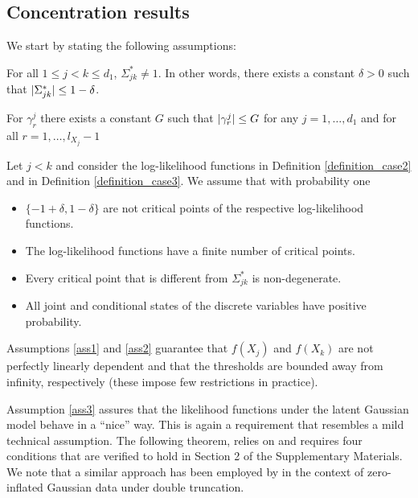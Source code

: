 \subsection{Concentration results}\label{sec::convergence_results}

We start by stating the following assumptions:

\begin{assumption}\label{ass1}
    For all $1 \leq j < k \leq d_1$, $\Sigma_{jk}^* \neq 1$. In other words, there exists a constant $\delta > 0$ such that $\lvert\Sigma_{jk}^*\rvert \leq 1 - \delta$.
\end{assumption}

\begin{assumption}\label{ass2}
    For $\gamma^j_r$ there exists a constant $G$ such that $\lvert\gamma^j_r\rvert \leq G$ for any $j = 1, \dots, d_1$ and for all $r = 1, \dots, l_{X_j}-1$
\end{assumption}

\begin{assumption}\label{ass3}
    Let $j < k$ and consider the log-likelihood functions in Definition \ref{definition_case2} and in Definition \ref{definition_case3}. We assume that with probability one
    \begin{itemize}
        \item $\{-1+\delta, 1 - \delta\}$ are not critical points of the respective log-likelihood functions.
        \item The log-likelihood functions have a finite number of critical points.
        \item Every critical point that is different from $\Sigma_{jk}^*$ is non-degenerate. 
        \item All joint and conditional states of the discrete variables have positive probability.
    \end{itemize}
\end{assumption}

\noindent Assumptions \ref{ass1} and \ref{ass2} guarantee that $f(X_j)$ and $f(X_k)$ are not perfectly linearly dependent and that the thresholds are bounded away from infinity, respectively (these impose few restrictions in practice). 


Assumption \ref{ass3} assures that the likelihood functions under the latent Gaussian model behave in a ``nice'' way. This is again a requirement that resembles a mild technical assumption. 
The following theorem, relies on \citet{Mei18} and requires four conditions that are verified to hold in Section 2 
of the Supplementary Materials. We note that a similar approach has been employed by \citet{Anne19} in the context of zero-inflated Gaussian data under double truncation.  


